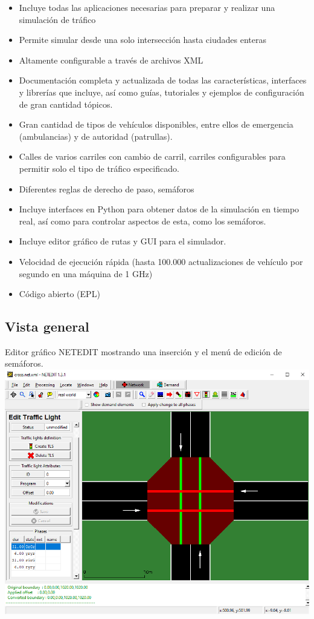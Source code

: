 \begin{itemize}
\tightlist
\item
  Incluye todas las aplicaciones necesarias para preparar y realizar una
  simulación de tráfico
\item
  Permite simular desde una solo intersección hasta ciudades enteras
\item
  Altamente configurable a través de archivos XML
\item
  Documentación completa y actualizada de todas las características,
  interfaces y librerías que incluye, así como guías, tutoriales y
  ejemplos de configuración de gran cantidad tópicos.
\item
  Gran cantidad de tipos de vehículos disponibles, entre ellos de
  emergencia (ambulancias) y de autoridad (patrullas).
\item
  Calles de varios carriles con cambio de carril, carriles configurables
  para permitir solo el tipo de tráfico especificado.
\item
  Diferentes reglas de derecho de paso, semáforos
\item
  Incluye interfaces en Python para obtener datos de la simulación en
  tiempo real, así como para controlar aspectos de esta, como los
  semáforos.
\item
  Incluye editor gráfico de rutas y GUI para el simulador.
\item
  Velocidad de ejecución rápida (hasta 100.000 actualizaciones de
  vehículo por segundo en una máquina de 1 GHz)
\item
  Código abierto (EPL)
\end{itemize}

\hypertarget{vista-general}{%
\subsection{Vista general}\label{vista-general}}

Editor gráfico NETEDIT mostrando una inserción y el menú de edición de
semáforos.
\includegraphics[width=\textwidth]{sumo/1cb8aa292f0be15b402ccd4f098f53e0.png}

